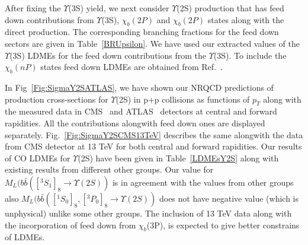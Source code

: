 \documentclass[review]{elsarticle}
\begin{document}
After fixing the $\Upsilon$(3S) yield, we next consider $\Upsilon$(2S) production 
that has feed down contributions from $\Upsilon$(3S), $\chi_b(2P)$ and $\chi_b(2P)$ states
along with the direct production. The corresponding
branching fractions for the feed down sectors are given in
Table~\ref{BRUpsilon}. We have used our extracted values of the $\Upsilon$(3S) LDMEs
for the feed down contributions from the $\Upsilon$(3S). To include the $\chi_b(nP)$ states feed down
LDMEs are obtained from Ref.~\cite{Sharma:2012dy,Feng:2015wka}.

In Fig~\ref{Fig:SigmaY2SATLAS}, we have shown our NRQCD predictions of production
cross-sections for $\Upsilon$(2S) in p+p collisions as functions of 
$p_T$ along with the measured data in CMS~\cite{Chatrchyan:2013yna} and ATLAS~\cite{Aad:2012dlq}
detectors at central and forward rapidities. All the contributions
alongwith feed down ones are displayed separately. Fig.~\ref{Fig:SigmaY2SCMS13TeV} describes 
the same alongwith the data from CMS detector at 13 TeV for 
both central and forward rapidities. Our results of CO LDMEs for 
$\Upsilon$(2S) have been given in Table~\ref{LDMEsY2S} along with existing results
from different other groups.
Our value for $M_L(b\bar{b}([^3S_1]_8 \rightarrow \Upsilon(2S))$ is in agreement with the
values from other groups also $M_L(b\bar{b}([^1S_0]_8,[^3P_0]_8 \rightarrow \Upsilon(2S))$
does not have negative value (which is unphysical) unlike some other groups.
The inclusion of 13 TeV data along with the incorporation of feed down from $\chi_{b}$(3P),
is expected to give better constrains of LDMEs.
\end{document}
